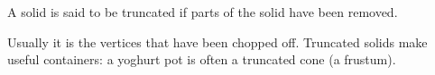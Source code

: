 A solid is said to be truncated if parts of the solid have been removed. 
\par
Usually it is the vertices that have been chopped off.
Truncated solids make useful containers: a yoghurt pot is often a 
truncated cone (a frustum).